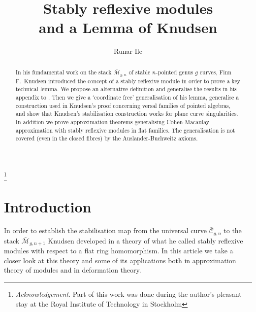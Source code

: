 \documentclass[a4paper,10pt]{amsart}
\theoremstyle{plain}
\theoremstyle{definition}
\theoremstyle{remark}
\numberwithin{equation}{xx}
\newcommand{\ms}[1]{\mathscr{{#1}}}
\begin{document}
%
\title[Stably reflexive modules]
{Stably reflexive modules \\and a Lemma of Knudsen}
\author{Runar Ile}
\address{Department of 
Mathematics \\University of Bergen \\
5008 Bergen \\ NORWAY}
\thanks{\textit{Acknowledgement}. Part of this work was done during the author's pleasant stay at the Royal Institute of Technology in Stockholm} %
\begin{abstract} 
In his fundamental work on the stack \(\bar{\ms{M}}_{g,n}\) of stable \(n\)-pointed genus \(g\) curves, Finn F.\ Knudsen introduced the concept of a stably reflexive module in order to prove a key technical lemma. We propose an alternative definition and generalise the results in his appendix to \cite{knu:83a}. Then we give a `coordinate free' generalisation of his lemma, generalise a construction used in Knudsen's proof concerning versal families of pointed algebras, and show that Knudsen's stabilisation construction works for plane curve singularities. In addition we prove approximation theorems generalising Cohen-Macaulay approximation with stably reflexive modules in flat families. The generalisation is not covered (even in the closed fibres) by the Auslander-Buchweitz axioms.
\end{abstract}
\maketitle
\section{Introduction}
In order to establish the stabilisation map from the universal curve \(\bar{\ms{C}}_{g,n}\) to the stack \(\bar{\ms{M}}_{g,n+1}\) Knudsen developed in \cite{knu:83a} a theory of what he called stably reflexive modules with respect to a flat ring homomorphism. In this article we take a closer look at this theory and some of its applications both in approximation theory of modules and in deformation theory.
\end{document}
